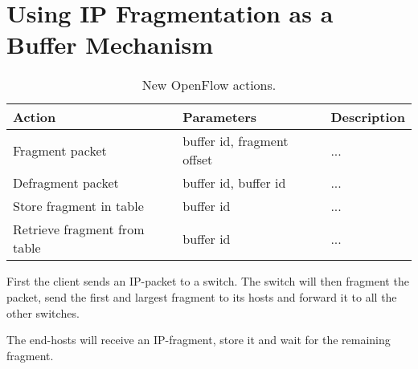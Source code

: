 \section{Using IP Fragmentation as a Buffer Mechanism}


\begin{table}[H]
  \centering
  \begin{tabular}{|l|l|l|}
    \hline \textbf{Action} & \textbf{Parameters} & \textbf{Description} \\
    \hline Fragment packet & buffer id, fragment offset & ... \\
    \hline Defragment packet & buffer id, buffer id & ... \\
    \hline Store fragment in table & buffer id & ... \\
    \hline Retrieve fragment from table & buffer id & ... \\
    \hline
  \end{tabular}

  \caption{New OpenFlow actions.}
  \label{table:openflow.new.actions}
\end{table}

First the client sends an IP-packet to a switch.
The switch will then fragment the packet, send the first and largest
fragment to its hosts and forward it to all the other switches.

The end-hosts will receive an IP-fragment, store it and
wait for the remaining fragment.

